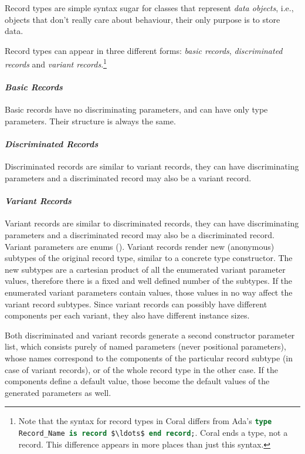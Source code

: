 Record types are simple syntax sugar for classes that represent {\em data objects}, i.e., objects that don't really care about behaviour, their only purpose is to store data. 

Record types can appear in three different forms: {\em basic records}, {\em discriminated records} and {\em variant records}.\footnote{Note that the syntax for record types in Coral differs from Ada's \lstinline[language=Ada]!type Record_Name is record $\ldots$ end record;!. Coral ends a type, not a record. This difference appears in more places than just this syntax.}

\paragraph{\em Basic Records}
Basic records have no discriminating parameters, and can have only type parameters. Their structure is always the same. 

\paragraph{\em Discriminated Records}
Discriminated records are similar to variant records, they can have discriminating parameters and a discriminated record may also be a variant record. 

\paragraph{\em Variant Records}
Variant records are similar to discriminated records, they can have discriminating parameters and a discriminated record may also be a discriminated record. Variant parameters are enums (). Variant records render new (anonymous) subtypes of the original record type, similar to a concrete type constructor. The new subtypes are a cartesian product of all the enumerated variant parameter values, therefore there is a fixed and well defined number of the subtypes. If the enumerated variant parameters contain values, those values in no way affect the variant record subtypes. Since variant records can possibly have different components per each variant, they also have different instance sizes. 

Both discriminated and variant records generate a second constructor parameter list, which consists purely of named parameters (never positional parameters), whose names correspond to the components of the particular record subtype (in case of variant records), or of the whole record type in the other case. If the components define a default value, those become the default values of the generated parameters as well. 

